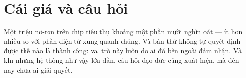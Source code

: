 \section*{Cái giá và câu hỏi}

Một triệu nơ-ron trên chip tiêu thụ khoảng một phần mười nghìn oát --- ít hơn nhiều so với phần điện tử xung quanh chúng. Và bàn thử không tự quyết định được thế nào là thành công: vai trò này luôn do ai đó bên ngoài đảm nhận. Và khi những hệ thống như vậy lớn dần, câu hỏi đạo đức cũng xuất hiện, mà đến nay chưa ai giải quyết.

